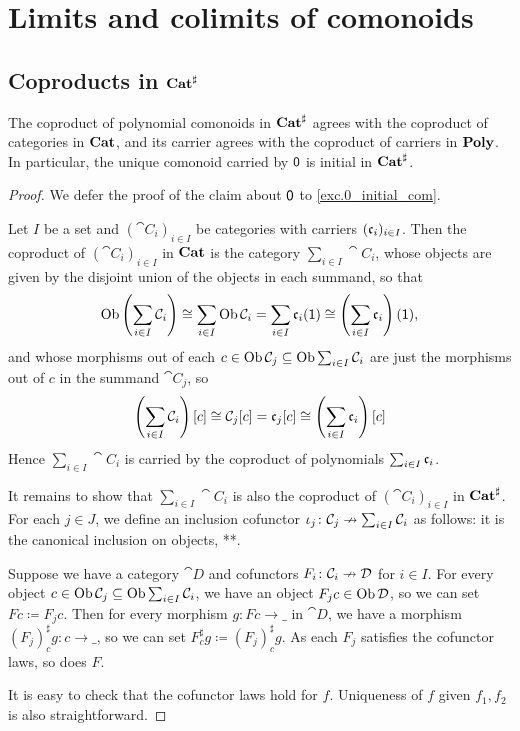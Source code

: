 \documentclass[Book-Poly]{subfiles}
\begin{document}

\section{Limits and colimits of comonoids}

\subsection{Coproducts in $\mathbf{Cat}^\sharp$}

\begin{proposition}
The coproduct of polynomial comonoids in $\mathbf{Cat}^\sharp$ agrees with the coproduct of categories in $\mathbf{Cat}$, and its carrier agrees with the coproduct of carriers in $\mathbf{Poly}$.
In particular, the unique comonoid carried by $\textsf{0}$ is initial in $\mathbf{Cat}^\sharp$.
\end{proposition}
\begin{proof}
We defer the proof of the claim about $\textsf{0}$ to \cref{exc.0_initial_com}.

Let $I$ be a set and $(\cat{C}_i)_{i\in I}$ be categories with carriers $(\mathfrak{c}_i)_{i\in I}$.
Then the coproduct of $(\cat{C}_i)_{i\in I}$ in $\mathbf{Cat}$ is the category $\sum_{i\in I}\cat{C}_i$, whose objects are given by the disjoint union of the objects in each summand, so that
\[
    \operatorname{Ob}\left(\sum_{i\in I}\mathcal{C}_i\right)\cong\sum_{i\in I}\operatorname{Ob}\mathcal{C}_i=\sum_{i\in I}\mathfrak{c}_i(\textsf{1})\cong\left(\sum_{i\in I}\mathfrak{c}_i\right)(\textsf{1}),
\]
and whose morphisms out of each $c\in\operatorname{Ob}\mathcal{C}_j\subseteq\operatorname{Ob}\sum_{i\in I}\mathcal{C}_i$ are just the morphisms out of $c$ in the summand $\cat{C}_j$, so
\[
    \left(\sum_{i\in I}\mathcal{C}_i\right)[c]\cong\mathcal{C}_j[c]=\mathfrak{c}_j[c]\cong\left(\sum_{i\in I}\mathfrak{c}_i\right)[c]
\]
Hence $\sum_{i\in I}\cat{C}_i$ is carried by the coproduct of polynomials $\sum_{i\in I}\mathfrak{c}_i$.


It remains to show that $\sum_{i\in I}\cat{C}_i$ is also the coproduct of $(\cat{C}_i)_{i\in I}$ in $\mathbf{Cat}^\sharp$.
For each $j\in J$, we define an inclusion cofunctor $\iota_j\colon\mathcal{C}_j\nrightarrow\sum_{i\in I}\mathcal{C}_i$ as follows: it is the canonical inclusion on objects, **. %

Suppose we have a category $\cat{D}$ and cofunctors $F_i\colon\mathcal{C}_i\nrightarrow\mathcal{D}$ for $i\in I$.
For every object $c\in\operatorname{Ob}\mathcal{C}_j\subseteq\operatorname{Ob}\sum_{i\in I}\mathcal{C}_i$, we have an object $F_j c\in\operatorname{Ob}\mathcal{D}$, so we can set $Fc\coloneqq F_j c$.
Then for every morphism $g\colon Fc\to\_$ in $\cat{D}$, we have a morphism $\left(F_j\right)^\sharp_c g\colon c\to\_$, so we can set $F^\sharp_c g\coloneqq\left(F_j\right)^\sharp_c g$.
As each $F_j$ satisfies the cofunctor laws, so does $F$.



It is easy to check that the cofunctor laws hold for $f$. Uniqueness of $f$ given $f_1,f_2$ is also straightforward.
\end{proof}
\end{document}
